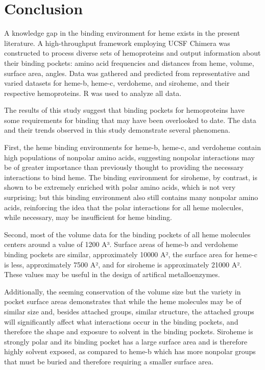 \documentclass[a4paper, nobind]{templates/ociamthesis}
\begin{document}
\adjustmtc
{}

\hypertarget{conclusion}{%
\chapter{Conclusion}\label{conclusion}}

A knowledge gap in the binding environment for heme exists in the present literature. A high-throughput framework employing UCSF Chimera was constructed to process diverse sets of hemoproteins and output information about their binding pockets: amino acid frequencies and distances from heme, volume, surface area, angles. Data was gathered and predicted from representative and varied datasets for heme-b, heme-c, verdoheme, and siroheme, and their respective hemoproteins. R was used to analyze all data.

The results of this study suggest that binding pockets for hemoproteins have some requirements for binding that may have been overlooked to date. The data and their trends observed in this study demonstrate several phenomena.

First, the heme binding environments for heme-b, heme-c, and verdoheme contain high populations of nonpolar amino acids, suggesting nonpolar interactions may be of greater importance than previously thought to providing the necessary interactions to bind heme. The binding environment for siroheme, by contrast, is shown to be extremely enriched with polar amino acids, which is not very surprising; but this binding environment also still contains many nonpolar amino acids, reinforcing the idea that the polar interactions for all heme molecules, while necessary, may be insufficient for heme binding.

Second, most of the volume data for the binding pockets of all heme molecules centers around a value of 1200 A³. Surface areas of heme-b and verdoheme binding pockets are similar, approximately 10000 A², the surface area for heme-c is less, approximately 7500 A², and for siroheme is approximately 21000 A². These values may be useful in the design of artifical metalloenzymes.

Additionally, the seeming conservation of the volume size but the variety in pocket surface areas demonstrates that while the heme molecules may be of similar size and, besides attached groups, similar structure, the attached groups will significantly affect what interactions occur in the binding pockets, and therefore the shape and exposure to solvent in the binding pockets. Siroheme is strongly polar and its binding pocket has a large surface area and is therefore highly solvent exposed, as compared to heme-b which has more nonpolar groups that must be buried and therefore requiring a smaller surface area.
\end{document}
